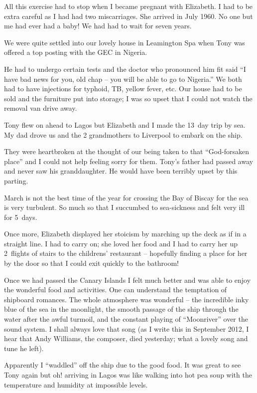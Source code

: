 All this exercise had to stop when I became pregnant with Elizabeth. I
had to be extra careful as I had had two miscarriages. She arrived in
July 1960. No one but me had ever had a baby! We had had to wait for
seven years.

We were quite settled into our lovely house in Leamington Spa when
Tony was offered a top posting with the GEC in Nigeria.

He had to undergo certain tests and the doctor who pronounced him fit
said ``I have bad news for you, old chap -- you will be able to go to
Nigeria.'' We both had to have injections for typhoid, TB, yellow
fever, etc. Our house had to be sold and the furniture put into
storage; I was so upset that I could not watch the removal van drive
away.

Tony flew on ahead to Lagos but Elizabeth and I made the 13~day trip
by sea. My dad drove us and the 2 grandmothers to Liverpool to embark
on the ship.

They were heartbroken at the thought of our being taken to that
``God-forsaken place'' and I could not help feeling sorry for
them. Tony's father had passed away and never saw his
granddaughter. He would have been terribly upset by this parting.

March is not the best time of the year for crossing the Bay of Biscay
for the sea is very turbulent. So much so that I succumbed to
sea-sickness and felt very ill for 5~days.

Once more, Elizabeth displayed her stoicism by marching up the deck as
if in a straight line. I had to carry on; she loved her food and I had
to carry her up 2~flights of stairs to the childrens' restaurant --
hopefully finding a place for her by the door so that I could exit
quickly to the bathroom!

Once we had passed the Canary Islands I felt much better and was able
to enjoy the wonderful food and activities. One can understand the
temptation of shipboard romances. The whole atmosphere was wonderful
-- the incredible inky blue of the sea in the moonlight, the smooth
passage of the ship through the water after the awful turmoil, and the
constant playing of ``Moonriver'' over the sound system. I shall
always love that song (as I write this in September 2012, I hear that
Andy Williams, the composer, died yesterday; what a lovely song and
tune he left).

Apparently I ``waddled'' off the ship due to the good food. It was
great to see Tony again but oh! arriving in Lagos was like walking
into hot pea soup with the temperature and humidity at impossible
levels.

